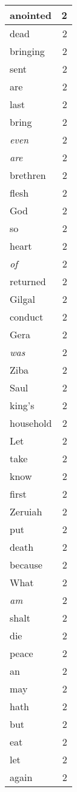 \begin{center}
\begin{longtable}{l|r}
anointed & 2 \\ \hline
dead & 2 \\ \hline
bringing & 2 \\ \hline
sent & 2 \\ \hline
are & 2 \\ \hline
last & 2 \\ \hline
bring & 2 \\ \hline
\emph{even} & 2 \\ \hline
\emph{are} & 2 \\ \hline
brethren & 2 \\ \hline
flesh & 2 \\ \hline
God & 2 \\ \hline
so & 2 \\ \hline
heart & 2 \\ \hline
\emph{of} & 2 \\ \hline
returned & 2 \\ \hline
Gilgal & 2 \\ \hline
conduct & 2 \\ \hline
Gera & 2 \\ \hline
\emph{was} & 2 \\ \hline
Ziba & 2 \\ \hline
Saul & 2 \\ \hline
king's & 2 \\ \hline
household & 2 \\ \hline
Let & 2 \\ \hline
take & 2 \\ \hline
know & 2 \\ \hline
first & 2 \\ \hline
Zeruiah & 2 \\ \hline
put & 2 \\ \hline
death & 2 \\ \hline
because & 2 \\ \hline
What & 2 \\ \hline
\emph{am} & 2 \\ \hline
shalt & 2 \\ \hline
die & 2 \\ \hline
peace & 2 \\ \hline
an & 2 \\ \hline
may & 2 \\ \hline
hath & 2 \\ \hline
but & 2 \\ \hline
eat & 2 \\ \hline
let & 2 \\ \hline
again & 2 \\ \hline

\end{longtable}
\end{center}
